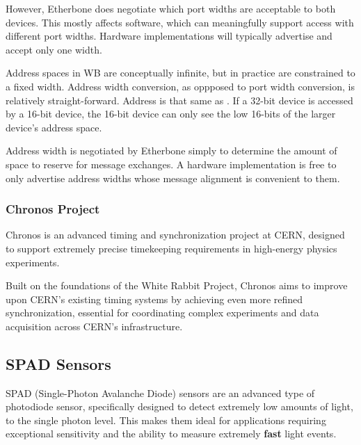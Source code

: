 \vspace{5 mm}

\noindent However, Etherbone does negotiate which port widths are acceptable to both devices. 
This mostly affects software, which can meaningfully support access with different port widths. 
Hardware implementations will typically advertise and accept only one width.

\vspace{5 mm}

\noindent Address spaces in WB are conceptually infinite, but in practice are constrained to a fixed width. 
Address width conversion, as oppposed to port width conversion, is relatively straight-forward. 
Address  is that same as . 
If a 32-bit device is accessed by a 16-bit device, the 16-bit device can only see the low 16-bits of the larger device's address space.

\vspace{5 mm}

\noindent Address width is negotiated by Etherbone simply to determine the amount of space to reserve for message exchanges. 
A hardware implementation is free to only advertise address widths whose message alignment is convenient to them.

\subsubsection{Chronos Project}

Chronos is an advanced timing and synchronization project at CERN, designed to support extremely precise timekeeping requirements in high-energy physics experiments. 

\vspace{5 mm}

\noindent Built on the foundations of the White Rabbit Project, Chronos \cite{gl:chronos} aims to improve upon CERN’s existing timing systems by achieving even more refined synchronization, essential for coordinating complex experiments and data acquisition across CERN’s infrastructure.

\subsection{SPAD Sensors}

SPAD (Single-Photon Avalanche Diode) \cite{9031298} sensors are an advanced type of photodiode sensor, specifically designed to detect extremely low amounts of light, to the single photon level. 
This makes them ideal for applications requiring exceptional sensitivity and the ability to measure extremely \textbf{fast} light events.

